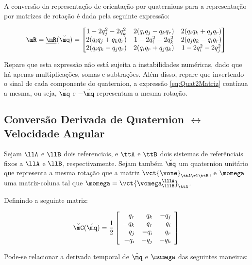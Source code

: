\documentclass[]{politex}
\begin{document}
A conversão da representação de orientação por quaternions para a representação por matrizes de rotação é dada pela seguinte expressão:

\begin{equation} \label{eq:Quat2Matriz}
\mR = \underline{\mR}(\breve{\mq}) = \begin{bmatrix}
1 - 2 q_j^2 - 2 q_k^2 & 2(q_i q_j - q_k q_r) & 2(q_i q_k + q_j q_r) \\
2(q_i q_j + q_k q_r) & 1 - 2 q_i^2 - 2q_k^2 & 2(q_j q_k - q_i q_r) \\
2(q_i q_k - q_j q_r) & 2(q_i q_r + q_j q_k) & 1 - 2 q_i^2 - 2 q_j^2
\end{bmatrix}
\end{equation}

Repare que esta expressão não está sujeita a instabilidades numéricas, dado que há apenas multiplicações, somas e subtrações. Além disso, repare que invertendo o sinal de cada componente do quaternion, a expressão \eqref{eq:Quat2Matriz} contínua a mesma, ou seja, $\breve{\mq}$ e $-\breve{\mq}$ representam a mesma rotação. 

\subsection{Conversão Derivada de Quaternion $\leftrightarrow$ Velocidade Angular} \label{subsec:DerivadaQuat}

Sejam $\llA$ e $\llB$ dois referenciais, e $\ttA$ e $\ttB$ dois sistemas de referênciais fixos a $\llA$ e $\llB$, respectivamente. Sejam também $\breve{\mq}$ um quaternion unitário que representa a mesma rotação que a matriz $\vct{\vone}_{\ttA \rl \ttB}$, e $\momega$ uma matriz-coluna tal que $\momega = \vct{\vomega_{\lllB}^{\lllA}}_{\ttA}$.

Definindo a seguinte matriz:

\begin{equation}
\breve{\mC}(\breve{\mq}) =
\frac{1}{2}
\begin{bmatrix}
\begin{array}{rrr}
q_r & q_k & -q_j \\
-q_k & q_r & q_i\\
q_j & -q_i & q_r\\
-q_i & -q_j & - q_k
\end{array}
\end{bmatrix}
\end{equation}

Pode-se relacionar a derivada temporal de $\breve{\mq}$ e $\momega$ das seguintes maneiras:
\end{document}
